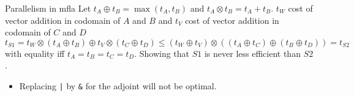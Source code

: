 \documentclass[9pt]{beamer}
\begin{document}
\begin{frame}{Parallelism in mfla}
Let $t_A \oplus t_B = \max(t_A,t_B)$  and $t_A \otimes t_B = t_A + t_B$. $t_W$ cost of vector addition in codomain of $A$ and $B$  and $t_V$ cost of vector addition in codomain of $C$ and $D$
$$
t_{S1} = t_W \otimes (t_A \oplus t_B) \oplus t_V \otimes (t_C \oplus t_D) \leq (t_W \oplus t_V) \otimes ((t_A \oplus t_C) \oplus (t_B \oplus t_D)) = t_{S2} $$
with equality iff $t_A = t_B = t_C = t_D$. Showing that $S1$ is never less efficient than $S2$.
\pause
\begin{itemize} 
\item Replacing \lstinline$|$ by \lstinline|&| for the adjoint will not be optimal. 
\end{itemize} 

\end{frame}
\end{document}
